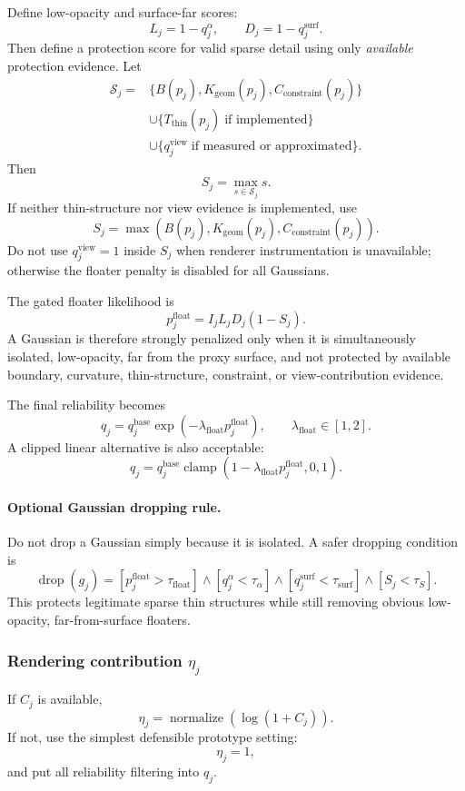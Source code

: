 \documentclass[11pt,a4paper]{article}
\newcommand{\clamp}{\operatorname{clamp}}
\newcommand{\normalize}{\operatorname{normalize}}
\begin{document}
Define low-opacity and surface-far scores:
\[
L_j=1-q_j^\alpha,
\qquad
D_j=1-q_j^{\mathrm{surf}}.
\]
Then define a protection score for valid sparse detail using only \emph{available} protection evidence. Let
\[
\begin{aligned}
\mathcal{S}_j={}&\{B(p_j),K_{\mathrm{geom}}(p_j),C_{\mathrm{constraint}}(p_j)\}\\
&\cup \{T_{\mathrm{thin}}(p_j)\;\text{if implemented}\}\\
&\cup \{q_j^{\mathrm{view}}\;\text{if measured or approximated}\}.
\end{aligned}
\]
Then
\[
S_j=\max_{s\in\mathcal{S}_j} s.
\]
If neither thin-structure nor view evidence is implemented, use
\[
S_j=\max\left(B(p_j),K_{\mathrm{geom}}(p_j),C_{\mathrm{constraint}}(p_j)\right).
\]
Do not use $q_j^{\mathrm{view}}=1$ inside $S_j$ when renderer instrumentation is unavailable; otherwise the floater penalty is disabled for all Gaussians.

The gated floater likelihood is
\[
p_j^{\mathrm{float}}=I_j L_j D_j (1-S_j).
\]
A Gaussian is therefore strongly penalized only when it is simultaneously isolated, low-opacity, far from the proxy surface, and not protected by available boundary, curvature, thin-structure, constraint, or view-contribution evidence.

The final reliability becomes
\[
q_j=q_j^{\mathrm{base}}\exp\left(-\lambda_{\mathrm{float}}p_j^{\mathrm{float}}\right),
\qquad \lambda_{\mathrm{float}}\in[1,2].
\]
A clipped linear alternative is also acceptable:
\[
q_j=q_j^{\mathrm{base}}\clamp(1-\lambda_{\mathrm{float}}p_j^{\mathrm{float}},0,1).
\]

\paragraph{Optional Gaussian dropping rule.}
Do not drop a Gaussian simply because it is isolated. A safer dropping condition is
\[
\operatorname{drop}(g_j)=
[p_j^{\mathrm{float}}>\tau_{\mathrm{float}}]
\land[q_j^\alpha<\tau_\alpha]
\land[q_j^{\mathrm{surf}}<\tau_{\mathrm{surf}}]
\land[S_j<\tau_S].
\]
This protects legitimate sparse thin structures while still removing obvious low-opacity, far-from-surface floaters.

\subsubsection{Rendering contribution $\eta_j$}

If $C_j$ is available,
\[
\eta_j=\normalize(\log(1+C_j)).
\]
If not, use the simplest defensible prototype setting:
\[
\eta_j=1,
\]
and put all reliability filtering into $q_j$.
\end{document}
